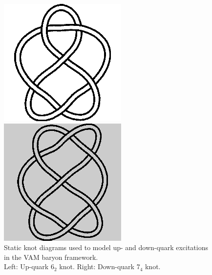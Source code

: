 \documentclass[12pt]{article}
\begin{document}
\begin{figure}[H]
\centering
\begin{minipage}{0.25\textwidth}
    \centering
        \includegraphics[width=\textwidth]{images/6_2.png}
\end{minipage}
\hspace{1em}
\begin{minipage}{0.25\textwidth}
    \centering
        \includegraphics[width=\textwidth]{images/7_4.png}
\end{minipage}
    \caption{Static knot diagrams used to model up- and down-quark excitations in the VAM baryon framework.\\
            Left: Up-quark \(6_2\) knot. Right: Down-quark \(7_4\) knot.}
\end{figure}
\end{document}

